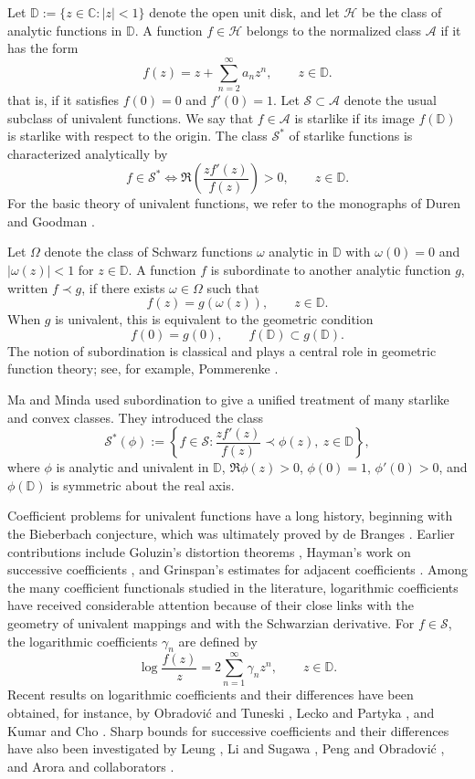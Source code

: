 \documentclass[11pt,reqno]{amsart}
\numberwithin{equation}{section}
\begin{document}
Let $\mathbb{D}:=\{z\in\mathbb{C}:|z|<1\}$ denote the open unit disk, and let $\mathcal{H}$ be the class of analytic functions in $\mathbb{D}$. A function $f\in\mathcal{H}$ belongs to the normalized class $\mathcal{A}$ if it has the form
\begin{equation}\label{eq1}
f(z)=z+\sum_{n=2}^{\infty}a_n z^n,\qquad z\in\mathbb{D}.
\end{equation}
that is, if it satisfies $f(0)=0$ and $f'(0)=1$. Let $\mathcal{S}\subset\mathcal{A}$ denote the usual subclass of univalent functions. We say that $f\in\mathcal{A}$ is starlike if its image $f(\mathbb{D})$ is starlike with respect to the origin. The class $\mathcal{S}^*$ of starlike functions is characterized analytically by
\[
f\in\mathcal{S}^*
\iff
\Re\left(\frac{zf'(z)}{f(z)}\right)>0,\qquad z\in\mathbb{D}.
\]
For the basic theory of univalent functions, we refer to the monographs of Duren \cite{PLD1} and Goodman \cite{G}.

Let $\Omega$ denote the class of Schwarz functions $\omega$ analytic in $\mathbb{D}$ with $\omega(0)=0$ and $|\omega(z)|<1$ for $z\in\mathbb{D}$. A function $f$ is subordinate to another analytic function $g$, written $f\prec g$, if there exists $\omega\in\Omega$ such that
\[
f(z)=g(\omega(z)),\qquad z\in\mathbb{D}.
\]
When $g$ is univalent, this is equivalent to the geometric condition
\[
f(0)=g(0),\qquad f(\mathbb{D})\subset g(\mathbb{D}).
\]
The notion of subordination is classical and plays a central role in geometric function theory; see, for example, Pommerenke \cite{Pommerenke1971}.

Ma and Minda \cite{MM} used subordination to give a unified treatment of many starlike and convex classes. They introduced the class
\[
\mathcal{S}^{*}(\phi)
:=
\left\{
f\in\mathcal{S}:
\frac{zf'(z)}{f(z)}\prec \phi(z),\ z\in\mathbb{D}
\right\},
\]
where $\phi$ is analytic and univalent in $\mathbb{D}$, $\Re\phi(z)>0$, $\phi(0)=1$, $\phi'(0)>0$, and $\phi(\mathbb{D})$ is symmetric about the real axis.

Coefficient problems for univalent functions have a long history, beginning with the Bieberbach conjecture, which was ultimately proved by de Branges \cite{LDB1}. Earlier contributions include Goluzin's distortion theorems \cite{G1}, Hayman's work on successive coefficients \cite{H}, and Grinspan's estimates for adjacent coefficients \cite{G2}. Among the many coefficient functionals studied in the literature, logarithmic coefficients have received considerable attention because of their close links with the geometry of univalent mappings and with the Schwarzian derivative. For $f\in\mathcal{S}$, the logarithmic coefficients $\gamma_n$ are defined by
\[
\log\frac{f(z)}{z}
=
2\sum_{n=1}^{\infty}\gamma_n z^n,\qquad z\in\mathbb{D}.
\]
Recent results on logarithmic coefficients and their differences have been obtained, for instance, by Obradovi\'c and Tuneski \cite{Obradovic2024}, Lecko and Partyka \cite{Lecko2023}, and Kumar and Cho \cite{Kumar2023}. Sharp bounds for successive coefficients and their differences have also been investigated by Leung \cite{Leung1978}, Li and Sugawa \cite{LiSugawa}, Peng and Obradovi\'c \cite{Peng2019}, and Arora and collaborators \cite{Arora2019,Arora2022,Arora2023}.
\end{document}
